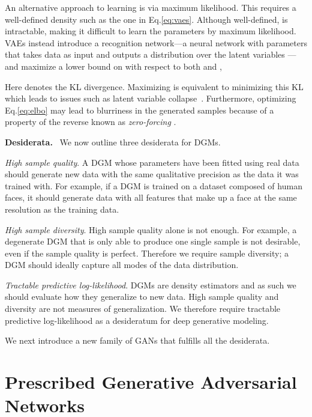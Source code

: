 \documentclass[11pt]{article}
\DeclareRobustCommand{\parhead}[1]{\textbf{#1}~}
\begin{document}
An alternative approach to learning  is via maximum likelihood. This requires a well-defined density  such as the one in Eq.\nobreakspace \ref {eq:vaes}. Although well-defined,  is intractable, making it difficult to learn the parameters  by maximum likelihood. \glspl{VAE} instead introduce a recognition network---a neural network with parameters  that takes data  as input and outputs a distribution over the latent variables ---and maximize a lower bound on  with respect to both  and ,

Here  denotes the \gls{KL} divergence. Maximizing  is equivalent to minimizing this \gls{KL} which leads to issues such as latent variable collapse~\citep{bowman2015generating, dieng2018avoiding}. Furthermore, optimizing Eq.\nobreakspace \ref {eq:elbo} may lead to blurriness in the generated samples because of a property of the reverse  known as \emph{zero-forcing} \citep{minka2005divergence}.

\parhead{Desiderata.} 
We now outline three desiderata for \glspl{DGM}.

\emph{High sample quality}. A \gls{DGM} whose parameters  have been fitted using real data should generate new data with the same qualitative precision as the data it was trained with. For example, if a \gls{DGM} is trained on a dataset composed of human faces, it should generate data with all features that make up a face at the same resolution as the training data.

\emph{High sample diversity}. High sample quality alone is not enough. For example, a degenerate \gls{DGM} that is only able to produce one single sample is not desirable, even if the sample quality is perfect.
Therefore we require sample diversity; a \gls{DGM} should ideally capture all modes of the data distribution.

\emph{Tractable predictive log-likelihood}. \glspl{DGM} are density estimators and as such we should evaluate how they generalize to new data. High sample quality and diversity are not measures of generalization. We therefore require tractable predictive log-likelihood as a desideratum for deep generative modeling.

We next introduce a new family of \glspl{GAN} that fulfills all the desiderata. 
 
\section{Prescribed Generative Adversarial Networks}
\label{sec:method}
\end{document}
